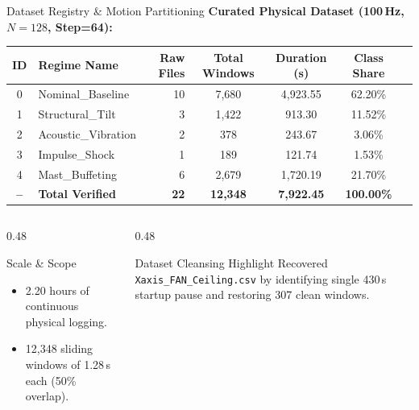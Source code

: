 \documentclass[aspectratio=169, 10pt]{beamer}
\begin{document}
\begin{frame}{Dataset Registry \& Motion Partitioning}
    \textbf{Curated Physical Dataset (100\,Hz, $N=128$, Step=64):}
    \begin{table}[h]
        \centering
        \small
        \begin{tabular}{clrcccc}
            \toprule
            \textbf{ID} & \textbf{Regime Name} & \textbf{Raw Files} & \textbf{Total Windows} & \textbf{Duration (s)} & \textbf{Class Share} \\
            \midrule
            0 & Nominal\_Baseline   & 10 & 7,680  & 4,923.55 & 62.20\% \\
            1 & Structural\_Tilt    &  3 & 1,422  &   913.30 & 11.52\% \\
            2 & Acoustic\_Vibration &  2 &   378  &   243.67 &  3.06\% \\
            3 & Impulse\_Shock      &  1 &   189  &   121.74 &  1.53\% \\
            4 & Mast\_Buffeting     &  6 & 2,679  & 1,720.19 & 21.70\% \\
            \midrule
            \textbf{--} & \textbf{Total Verified} & \textbf{22} & \textbf{12,348} & \textbf{7,922.45} & \textbf{100.00\%} \\
            \bottomrule
        \end{tabular}
    \end{table}
    \vspace{0.2cm}
    \begin{columns}[T]
        \begin{column}{0.48\textwidth}
            \begin{block}{Scale \& Scope}
                \begin{itemize}
                    \item 2.20 hours of continuous physical logging.
                    \item 12,348 sliding windows of 1.28\,s each (50\% overlap).
                \end{itemize}
            \end{block}
        \end{column}
        \begin{column}{0.48\textwidth}
            \begin{exampleblock}{Dataset Cleansing Highlight}
                Recovered \texttt{Xaxis\_FAN\_Ceiling.csv} by identifying single 430\,s startup pause and restoring 307 clean windows.
            \end{exampleblock}
        \end{column}
    \end{columns}
\end{frame}
\end{document}
